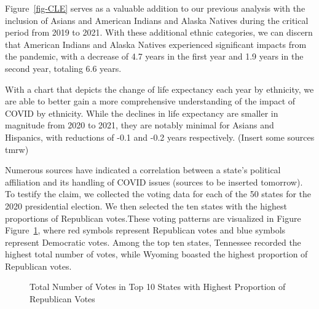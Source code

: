 \documentclass[
  letterpaper,
  DIV=11,
  numbers=noendperiod]{scrartcl}
\begin{document}
Figure~\ref{fig-CLE} serves as a valuable addition to our previous
analysis with the inclusion of Asians and American Indians and Alaska
Natives during the critical period from 2019 to 2021. With these
additional ethnic categories, we can discern that American Indians and
Alaska Natives experienced significant impacts from the pandemic, with a
decrease of 4.7 years in the first year and 1.9 years in the second
year, totaling 6.6 years.

With a chart that depicts the change of life expectancy each year by
ethnicity, we are able to better gain a more comprehensive understanding
of the impact of COVID by ethnicity. While the declines in life
expectancy are smaller in magnitude from 2020 to 2021, they are notably
minimal for Asians and Hispanics, with reductions of -0.1 and -0.2 years
respectively. (Insert some sources tmrw)

Numerous sources have indicated a correlation between a state's
political affiliation and its handling of COVID issues (sources to be
inserted tomorrow). To testify the claim, we collected the voting data
for each of the 50 states for the 2020 presidential election. We then
selected the ten states with the highest proportions of Republican
votes.These voting patterns are visualized in Figure
Figure~\ref{fig-Vote}, where red symbols represent Republican votes and
blue symbols represent Democratic votes. Among the top ten states,
Tennessee recorded the highest total number of votes, while Wyoming
boasted the highest proportion of Republican votes.

\begin{figure}


\caption{\label{fig-Vote}Total Number of Votes in Top 10 States with
Highest Proportion of Republican Votes}

\end{figure}%
\end{document}
